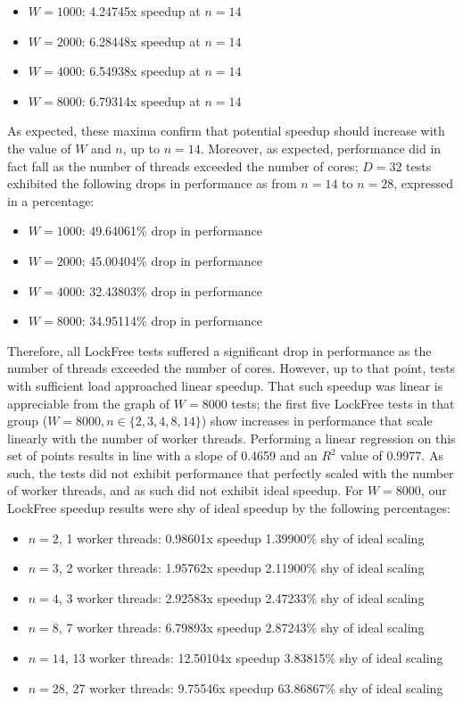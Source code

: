 \documentclass[]{article}
\begin{document}
\begin{itemize}
	\item$W = 1000$: 4.24745x speedup at $n = 14$
	\item$W = 2000$: 6.28448x speedup at $n = 14$
	\item$W = 4000$: 6.54938x speedup at $n = 14$
	\item$W = 8000$: 6.79314x speedup at $n = 14$
\end{itemize}
As expected, these maxima confirm that potential speedup should increase with the value of $W$ and $n$, up to $n = 14$. Moreover, as expected, performance did in fact fall as the number of threads exceeded the number of cores; $D = 32$ tests exhibited the following drops in performance as from $n = 14$ to $n = 28$, expressed in a percentage:
\begin{itemize}
	\item$W = 1000$: 49.64061\% drop in performance
	\item$W = 2000$: 45.00404\% drop in performance
	\item$W = 4000$: 32.43803\% drop in performance
	\item$W = 8000$: 34.95114\% drop in performance	
\end{itemize}
Therefore, all LockFree tests suffered a significant drop in performance as the number of threads exceeded the number of cores. However, up to that point, tests with sufficient load approached linear speedup. That such speedup was linear is appreciable from the graph of $W = 8000$ tests; the first five LockFree tests in that group ($W= 8000, n \in \{2, 3, 4, 8, 14\}$) show increases in performance that scale linearly with the number of worker threads. Performing a linear regression on this set of points results in line with a slope of 0.4659 and an $R^2$ value of  0.9977. As such, the tests did not exhibit performance that perfectly scaled with the number of worker threads, and as such did not exhibit ideal speedup. For $W = 8000$, our LockFree speedup results were shy of ideal speedup by the following percentages: 
\begin{itemize}
	\item$n = 2$, 1 worker threads: 0.98601x speedup 1.39900\% shy of ideal scaling
	\item$n = 3$, 2 worker threads: 1.95762x speedup 2.11900\% shy of ideal scaling
	\item$n = 4$, 3 worker threads: 2.92583x speedup 2.47233\% shy of ideal scaling
	\item$n = 8$, 7 worker threads: 6.79893x speedup 2.87243\% shy of ideal scaling
	\item$n = 14$, 13 worker threads: 12.50104x speedup 3.83815\% shy of ideal scaling
	\item$n = 28$, 27 worker threads: 9.75546x speedup 63.86867\% shy of ideal scaling
\end{itemize}
\end{document}
